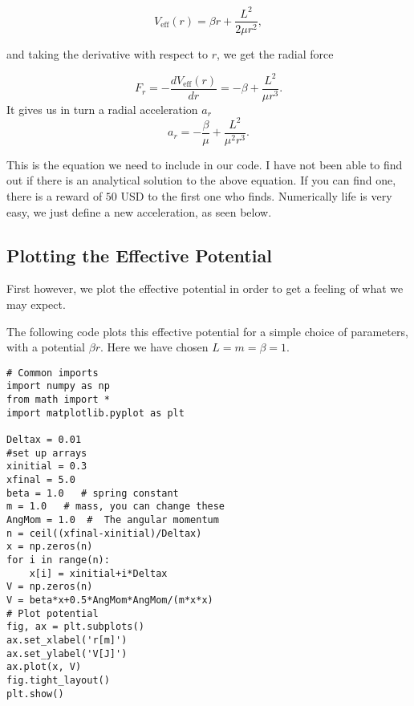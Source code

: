 \documentclass[%
oneside,                 %
final,                   %
10pt]{article}
\begin{document}
\[
V_{\mathrm{eff}}(r) = \beta r+\frac{L^2}{2\mu r^2},
\]

and taking the derivative with respect to $r$, we get the radial force

\[
F_r=-\frac{dV_{\mathrm{eff}}(r)}{dr} = -\beta+\frac{L^2}{\mu r^3}.
\]
It gives us in turn a radial acceleration $a_r$
\[
a_r= -\frac{\beta}{\mu}+\frac{L^2}{\mu^2 r^3}.
\]

This is the equation we need to include in our code. I have not been able to find out if there is an analytical solution to the above equation. If you can find one, there is a reward of $50$ USD to the first one who finds. Numerically life is very easy, we just define a new acceleration, as seen below.

\subsection*{Plotting the Effective Potential}

First however, we plot the effective potential in order to get a feeling of what we may expect.

The following code plots this effective potential for a simple choice of parameters, with a potential $\beta r $. Here we have chosen $L=m=\beta=1$. 



























\begin{verbatim}
# Common imports
import numpy as np
from math import *
import matplotlib.pyplot as plt

Deltax = 0.01
#set up arrays
xinitial = 0.3
xfinal = 5.0
beta = 1.0   # spring constant
m = 1.0   # mass, you can change these
AngMom = 1.0  #  The angular momentum
n = ceil((xfinal-xinitial)/Deltax)
x = np.zeros(n)
for i in range(n):
    x[i] = xinitial+i*Deltax
V = np.zeros(n)
V = beta*x+0.5*AngMom*AngMom/(m*x*x)
# Plot potential
fig, ax = plt.subplots()
ax.set_xlabel('r[m]')
ax.set_ylabel('V[J]')
ax.plot(x, V)
fig.tight_layout()
plt.show()


\end{verbatim}
\end{document}
